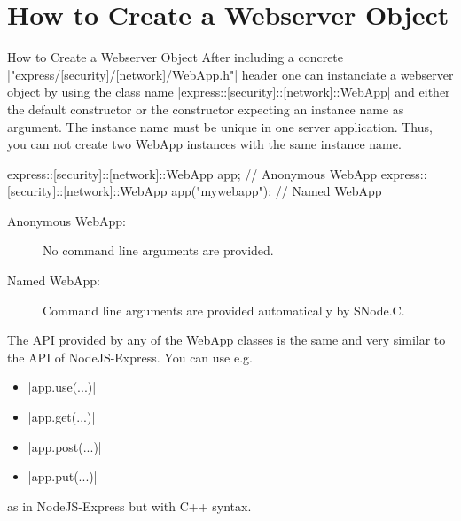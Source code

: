 ﻿\section[nosectionpage]{How to Create a Webserver Object}

\begin{frame}[fragile]{How to Create a Webserver Object}
  After including a concrete \inlinecppcode|"express/[security]/[network]/WebApp.h"| header one can instanciate a webserver object by using the class name \inlinecppcode|express::[security]::[network]::WebApp| and either the \textcolor{fh-ooe-red}{default constructor} or the \textcolor{fh-ooe-red}{constructor expecting} an \textcolor{fh-ooe-red}{instance name} as argument.
  The \textcolor{fh-ooe-red}{instance name} must be \textcolor{fh-ooe-red}{unique} in one server application. Thus, you can \textcolor{fh-ooe-red}{not} create \textcolor{fh-ooe-red}{two WebApp instances} with the \textcolor{fh-ooe-red}{same instance name}.

  \begin{cppcode}[gobble=4]
    express::[security]::[network]::WebApp app;             // Anonymous WebApp
    express::[security]::[network]::WebApp app("mywebapp"); // Named WebApp
  \end{cppcode}
  \begin{description}
    \item [Anonymous WebApp:] No command line arguments are provided.
    \item [Named WebApp:] Command line arguments are provided automatically by SNode.C.
  \end{description}
  The \textcolor{fh-ooe-red}{API} provided by any of the \textcolor{fh-ooe-red}{WebApp} classes is the same and very \textcolor{fh-ooe-red}{similar} to the \textcolor{fh-ooe-red}{API of NodeJS-Express}. You can use e.g.
  \begin{itemize}
    \item \inlinecppcode|app.use(...)|
    \item \inlinecppcode|app.get(...)|
    \item \inlinecppcode|app.post(...)|
    \item \inlinecppcode|app.put(...)|
  \end{itemize}
  as in NodeJS-Express but with C++ syntax.
\end{frame}
